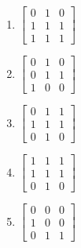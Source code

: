 \documentclass[sigconf]{acmart}
\begin{document}
\begin{enumerate}[label=(\alph*)]
\item
	$
	\begin{bmatrix}
	   0 & 1 & 0 \\
 	   1 & 1 & 1 \\
 	   1 & 1 & 1
	\end{bmatrix}
	$
	\item
	$
	\begin{bmatrix}
	   0 & 1 & 0 \\
 	   0 & 1 & 1 \\
 	   1 & 0 & 0
	\end{bmatrix}
	$
	\item
	$
	\begin{bmatrix}
	   0 & 1 & 1 \\
 	   1 & 1 & 1 \\
 	   0 & 1 & 0
	\end{bmatrix}
	$
	\item
	$
	\begin{bmatrix}
	   1 & 1 & 1 \\
 	   1 & 1 & 1 \\
 	   0 & 1 & 0
	\end{bmatrix}
	$
	\item
	$
	\begin{bmatrix}
	   0 & 0 & 0 \\
 	   1 & 0 & 0 \\
 	   0 & 1 & 1
	\end{bmatrix}
	$
\end{enumerate}
\end{document}
